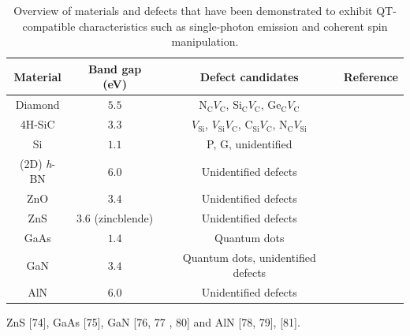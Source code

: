 \documentclass[superscriptaddress,unsortedaddress,
 amsmath,amssymb,
 aps,
]{revtex4-2}
\begin{document}
\begin{table}[t]
    \centering
    \begin{tabular}{c|c|c|c}
    Material & Band gap (eV) & Defect candidates & Reference \\
    \hline
    Diamond  & $5.5$  & N$_\mathrm{C}V_\mathrm{C}$, Si$_\mathrm{C}V_\mathrm{C}$, Ge$_\mathrm{C}V_\mathrm{C}$ & \cite{Balasubramanian_2009,Rogers_2014,Bhaskar_2018} \\  
    4H-SiC & $3.3$ & $V_\mathrm{Si}$, $V_\mathrm{Si}V_\mathrm{C}$, C$_\mathrm{Si}V_\mathrm{C}$, N$_\mathrm{C}V_\mathrm{Si}$ & \cite{Widmann2014,Christle_2015,Castelletto_2014,Zargaleh_2018} \\ 
    Si & $1.1$ & P, G, unidentified & \cite{Muhonen_2014,Durand_2020,Redjem2020} \\ 
    (2D) \textit{h}-BN & $6.0$ & Unidentified defects & \cite{Tran_2016,Tran_2016b,Hayee_2020} \\ 
    ZnO & $3.4$ & Unidentified defects & \cite{Morfa2012} \\ 
    ZnS & $3.6$ (zincblende) & Unidentified defects & \cite{Stewart2019} \\ 
    GaAs & $1.4$ & Quantum dots & \cite{Bluhm2010} \\ 
    GaN & $3.4$ & Quantum dots, unidentified defects & \cite{Roux2017,Berhane2018} \\
    AlN & $6.0$ & Unidentified defects & \cite{Xue2020}\\
    \end{tabular}
    \caption{Overview of materials and defects that have been demonstrated to exhibit QT-compatible characteristics such as single-photon emission and coherent spin manipulation.}
    \label{tab:qt-materials}
\end{table}

 ZnS [74], GaAs [75],
GaN [76, 77 , 80] and AlN [78, 79],  [81]. 
\end{document}
